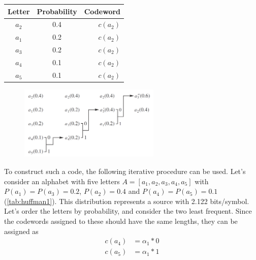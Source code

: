       \begin{table}
        \centering
        \begin{tabular}{ccr}
          \toprule
          Letter & Probability & Codeword \\
          \midrule
          $a_2$ & 0.4 & $c(a_2)$ \\
          $a_1$ & 0.2 & $c(a_2)$ \\
          $a_3$ & 0.2 & $c(a_2)$ \\
          $a_4$ & 0.1 & $c(a_2)$ \\
          $a_5$ & 0.1 & $c(a_2)$ \\
          \bottomrule
        \end{tabular}
        \label{tab:huffman1}
      \end{table}
  
      \begin{figure}
        \centering
        \includegraphics[width=0.6\textwidth]{huffman}
        \label{fig:huffman}
      \end{figure}
  
      To construct such a code, the following iterative procedure can be used. Let's consider an alphabet with five letters $A = [a_1,a_2,a_3,a_4,a_5]$ with $P(a_1)=P(a_3)=0.2$, $P(a_2)=0.4$ and $P(a_4)=P(a_5)=0.1$ (\autoref{tab:huffman1}). This distribution represents a source with 2.122 bits/symbol. Let's order the letters by probability, and consider the two least frequent. Since the codewords assigned to these should have the same lengths, they can be assigned as
      \begin{align*}
        c(a_4) &= \alpha_1 * 0 \\
        c(a_5) &= \alpha_1 *1
      \end{align*}
  
